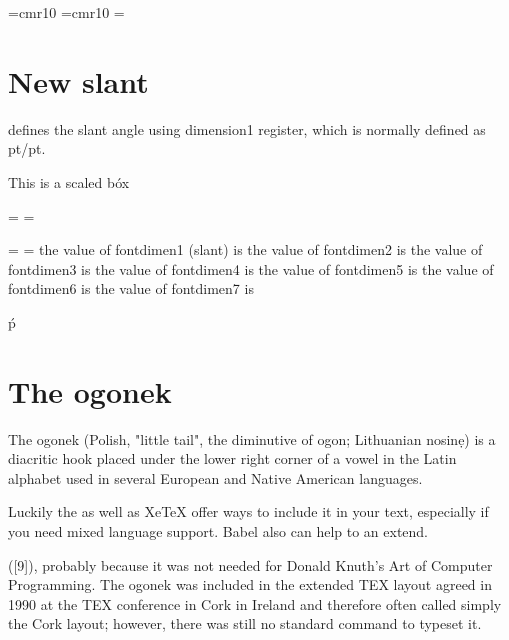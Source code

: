 \begin{teX}

\font \roman=cmr10
\font\specroman=cmr10
\newdimen\savedvalue
\savedvalue=\roman
\newdimen\specialvalue
\specialvalue=13.0pt
\def \rm{%
  \fontdimen2\roman=\savedvalue }
\def\specrm{%
  \aftergroup\restoredimen
  \fontdimen2\specroman=\specialvalue
  \specroman  }
\def\restoredimen{%
\fontdimen2\roman=\savedvalue }



\section*{New slant} 
\tex defines the slant angle using dimension1 register, which is normally defined as pt/pt.
\medskip


 This is a scaled b\'  ox

\specrm 


\medskip
{\noindent\obeylines\specrm 
the value of fontdimen1 (slant)  is \the{}\font
the value of fontdimen2 is \the{}\font  
the value of fontdimen3 is \the{}\font 
the value of fontdimen4 is \the{}\font 
the value of fontdimen5 is \the{}\font 
the value of fontdimen6 is \the{}\font 
the value of fontdimen7 is \the{}\font 
}

\medskip

        \' p

\end{teX}


\section{The ogonek}

The ogonek (Polish, "little tail", the diminutive of ogon; Lithuanian nosin\d e) is a diacritic hook placed under the lower right corner of a vowel in the Latin alphabet used in several European and Native American languages.

Luckily the  as well as XeTeX offer ways to include it in your text, especially if you need mixed language support. Babel also can help to an extend.

([9]), probably because it was not needed for Donald Knuth’s Art of Computer
Programming. The ogonek was included in the extended TEX layout agreed in
1990 at the TEX conference in Cork in Ireland and therefore often called simply
the Cork layout; however, there was still no standard command to typeset it.

